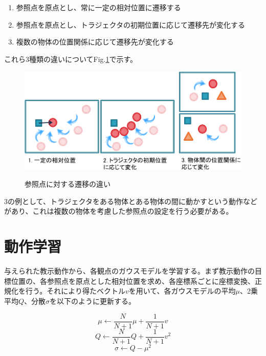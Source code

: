 	\begin{enumerate}
		\item 参照点を原点とし、常に一定の相対位置に遷移する
		\item 参照点を原点とし、トラジェクタの初期位置に応じて遷移先が変化する
		\item 複数の物体の位置関係に応じて遷移先が変化する
	\end{enumerate}
これら3種類の違いについてFig.\ref{figure:difference_displacement}で示す。
	\begin{figure}[t]
		\begin{center}
			\includegraphics[width=14cm]{figure2.png} \\ %
			\caption{参照点に対する遷移の違い}
			\label{figure:difference_displacement}
		\end{center}
	\end{figure}

3の例として、トラジェクタをある物体とある物体の間に動かすという動作などがあり、これは複数の物体を考慮した参照点の設定を行う必要がある。

\section{動作学習}

与えられた教示動作から、各観点のガウスモデルを学習する。まず教示動作の目標位置の、各参照点を原点とした相対位置を求め、各座標系ごとに座標変換、正規化を行う。それにより得たベクトル$v$を用いて、各ガウスモデルの平均$μ$、2乗平均$Q$、分散$σ$を以下のように更新する。

\[
	μ  \leftarrow \frac{N}{N+1}μ+\frac{1}{N+1}v
\]
\[
	Q  \leftarrow \frac{N}{N+1}Q+\frac{1}{N+1}v^2	
\]
\[
	σ  \leftarrow Q - μ^2
\]

